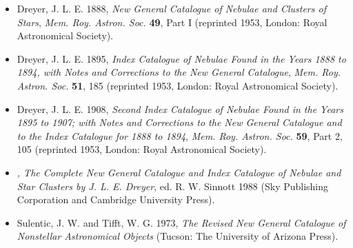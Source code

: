 \begin{itemize}

\item Dreyer, J. L. E. 1888, {\em New General Catalogue of Nebulae and Clusters
of Stars}, {\em Mem. Roy. Astron. Soc.} {\bf 49}, Part I (reprinted 1953,
London: Royal Astronomical Society).

\item Dreyer, J. L. E. 1895, {\em Index Catalogue of Nebulae Found in the Years
1888 to 1894, with Notes and Corrections to the New General Catalogue}, {\em
Mem. Roy. Astron. Soc.} {\bf 51}, 185 (reprinted 1953, London: Royal
Astronomical Society).

\item Dreyer, J. L. E. 1908, {\em Second Index Catalogue of Nebulae Found in the
Years 1895 to 1907; with Notes and Corrections to the New General Catalogue and
to the Index Catalogue for 1888 to 1894}, {\em Mem. Roy. Astron. Soc.} {\bf 59},
Part 2, 105 (reprinted 1953, London: Royal Astronomical Society).

\item {\em \cat, The Complete New General Catalogue and Index Catalogue of
Nebulae and Star Clusters by J. L. E. Dreyer}, ed. R. W. Sinnott 1988 (Sky
Publishing Corporation and Cambridge University Press).

\item Sulentic, J. W. and Tifft, W. G. 1973, {\em The Revised New General
Catalogue of Nonstellar Astronomical Objects} (Tucson: The University of Arizona
Press).

\end{itemize}


